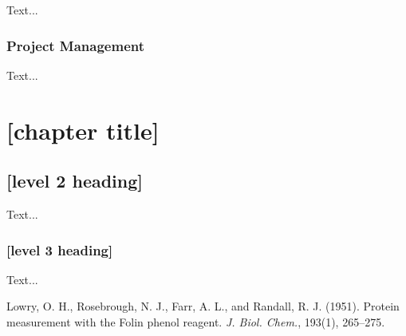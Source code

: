 \documentclass[12pt,a4paper]{report}
\begin{document}

Text...


\subsection{Project Management}


Text...


\chapter{[chapter title]}

\section{[level 2 heading]}

Text...

\subsection{[level 3 heading]}

Text...


\renewcommand{\bibname}{REFERENCES}





\begin{thebibliography}{10}


Lowry, O. H., Rosebrough, N. J., Farr, A. L., and Randall, R. J. (1951). Protein measurement with the Folin phenol reagent. \emph{J. Biol. Chem.}, 193(1), 265--275.

\end{thebibliography}
\end{document}
